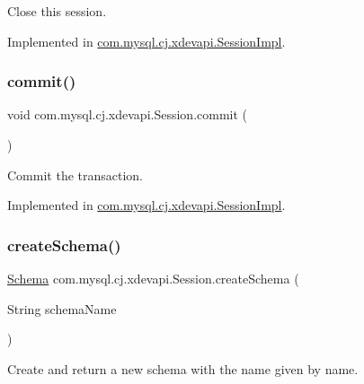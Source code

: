 Close this session. 

Implemented in \mbox{\hyperlink{classcom_1_1mysql_1_1cj_1_1xdevapi_1_1_session_impl_a84c222e009725cc3984f4edd56effec8}{com.\+mysql.\+cj.\+xdevapi.\+Session\+Impl}}.

\mbox{\label{interfacecom_1_1mysql_1_1cj_1_1xdevapi_1_1_session_ada6a17d457c7b1387c094862e465dc01}} 
\subsubsection{\texorpdfstring{commit()}{commit()}}
{\footnotesize\ttfamily void com.\+mysql.\+cj.\+xdevapi.\+Session.\+commit (\begin{DoxyParamCaption}{ }\end{DoxyParamCaption})}

Commit the transaction. 

Implemented in \mbox{\hyperlink{classcom_1_1mysql_1_1cj_1_1xdevapi_1_1_session_impl_a63bd825fc3c1d7b27cd7294bef2c8a65}{com.\+mysql.\+cj.\+xdevapi.\+Session\+Impl}}.

\mbox{\label{interfacecom_1_1mysql_1_1cj_1_1xdevapi_1_1_session_a09866b1dd34b22cfc24ef9517387da9f}} 
\subsubsection{\texorpdfstring{create\+Schema()}{createSchema()}\hspace{0.1cm}{\footnotesize\ttfamily [1/2]}}
{\footnotesize\ttfamily \mbox{\hyperlink{interfacecom_1_1mysql_1_1cj_1_1xdevapi_1_1_schema}{Schema}} com.\+mysql.\+cj.\+xdevapi.\+Session.\+create\+Schema (\begin{DoxyParamCaption}\item[{String}]{schema\+Name }\end{DoxyParamCaption})}

Create and return a new schema with the name given by name.


